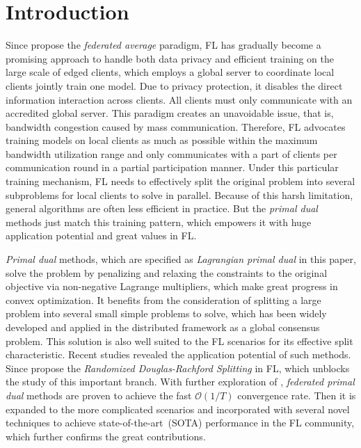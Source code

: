 \section{Introduction}
\label{introduction}

Since \citet{mcmahan2017communication} propose the \textit{federated average} paradigm, FL has gradually become a promising approach to handle both data privacy and efficient training on the large scale of edged clients, which employs a global server to coordinate local clients jointly train one model. Due to privacy protection, it disables the direct information interaction across clients. All clients must only communicate with an accredited global server. This paradigm creates an unavoidable issue, that is, bandwidth congestion caused by mass communication. Therefore, FL advocates training models on local clients as much as possible within the maximum bandwidth utilization range and only communicates with a part of clients per communication round in a partial participation manner. Under this particular training mechanism, FL needs to effectively split the original problem into several subproblems for local clients to solve in parallel. Because of this harsh limitation, general algorithms are often less efficient in practice. But the \textit{primal dual} methods just match this training pattern, which empowers it with huge application potential and great values in FL.

\textit{Primal dual} methods, which are specified as \textit{Lagrangian primal dual} in this paper, solve the problem by penalizing and relaxing the constraints to the original objective via non-negative Lagrange multipliers, which make great progress in convex optimization. It benefits from the consideration of splitting a large problem into several small simple problems to solve, which has been widely developed and applied in the distributed framework as a global consensus problem. This solution is also well suited to the FL scenarios for its effective split characteristic. Recent studies revealed the application potential of such methods. Since \citet{tran2021feddr} propose the \textit{Randomized Douglas-Rachford Splitting} in FL, which unblocks the study of this important branch. With further exploration of \citet{zhang2021fedpd,durmus2021federated,zhang2021connection}, \textit{federated primal dual} methods are proven to achieve the fast $\mathcal{O}(1/T)$ convergence rate. Then it is expanded to the more complicated scenarios and incorporated with several novel techniques to achieve state-of-the-art~(SOTA) performance in the FL community, which further confirms the great contributions.

